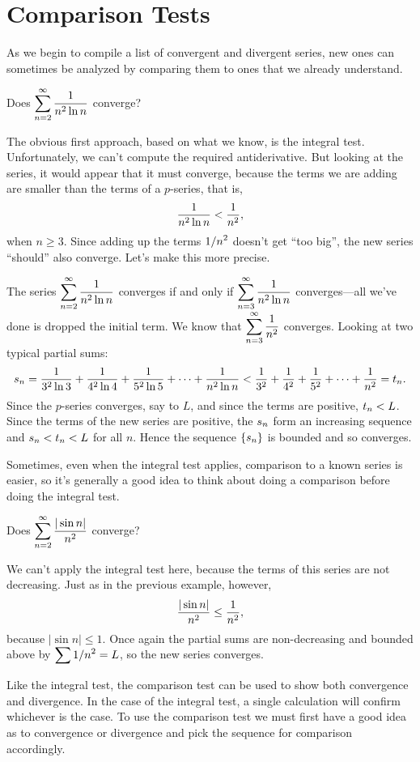 \section{Comparison Tests}{}{}
\nobreak
As we begin to compile a list of convergent and divergent series, new
ones can sometimes be analyzed by comparing them to ones that we
already understand.

\example Does $\displaystyle\sum_{n=2}^\infty {1\over n^2\ln n}$ converge?

\ssk
The obvious first approach, based on what we know, is the integral test.
Unfortunately, we can't compute the required antiderivative. But
looking at the series, it would appear that it must converge, because
the terms we are adding are smaller than the terms of a $p$-series,
that is,
$${1\over n^2\ln n}<{1\over n^2},$$
when $n\ge3$. Since adding up the terms $\displaystyle 1/n^2$ doesn't get ``too
big'', the new series ``should'' also converge. Let's make this more
precise.

The series $\displaystyle\sum_{n=2}^\infty {1\over n^2\ln n}$ converges if and
only if $\displaystyle\sum_{n=3}^\infty {1\over n^2\ln n}$ converges---all we've
done is dropped the initial term. We know that 
$\displaystyle\sum_{n=3}^\infty {1\over n^2}$ converges. Looking at two typical
partial sums:
$$
  s_n={1\over 3^2\ln 3}+{1\over 4^2\ln 4}+{1\over 5^2\ln 5}+\cdots+
  {1\over n^2\ln n} < {1\over 3^2}+{1\over 4^2}+
  {1\over 5^2}+\cdots+{1\over n^2}=t_n.
$$
Since the $p$-series converges, say to $L$, and since the terms are positive,
$\displaystyle t_n<L$. Since the terms of the new series are positive, the $\displaystyle s_n$
form an increasing sequence and $\displaystyle s_n<t_n<L$ for all $n$. Hence the
sequence $\displaystyle \{s_n\}$ is bounded and so converges.
\endexample

Sometimes, even when the integral test applies, comparison to a known
series is easier, so it's generally a good idea to think about doing a
comparison before doing the integral test.

\example \relax{}
Does $\displaystyle\sum_{n=2}^\infty {|\sin n|\over n^2}$ converge?

\ssk
We can't apply the integral test here, because the terms of this
series are not decreasing. Just as in the previous example, however,
$$ {|\sin n|\over n^2}\le {1\over n^2},$$
because $|\sin n|\le 1$. Once again the partial sums are
non-decreasing and bounded above by $\displaystyle \sum 1/n^2=L$, so the new series
converges. 
\endexample

Like the integral test, the comparison test can be used to show both
convergence and divergence. In the case of the integral test, a single
calculation will confirm whichever is the case. To use the comparison
test we must first have a good idea as to convergence or divergence
and pick the sequence for comparison accordingly.

